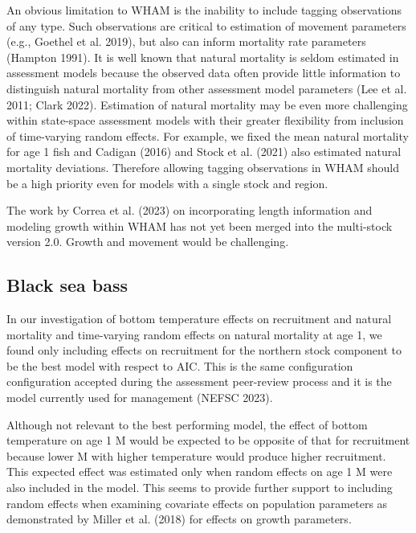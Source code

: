 \documentclass[
]{article}
\begin{document}
An obvious limitation to WHAM is the inability to include tagging
observations of any type. Such observations are critical to estimation
of movement parameters (e.g., Goethel et al. 2019), but also can inform
mortality rate parameters (Hampton 1991). It is well known that natural
mortality is seldom estimated in assessment models because the observed
data often provide little information to distinguish natural mortality
from other assessment model parameters (Lee et al. 2011; Clark 2022).
Estimation of natural mortality may be even more challenging within
state-space assessment models with their greater flexibility from
inclusion of time-varying random effects. For example, we fixed the mean
natural mortality for age 1 fish and Cadigan (2016) and Stock et al.
(2021) also estimated natural mortality deviations. Therefore allowing
tagging observations in WHAM should be a high priority even for models
with a single stock and region.

The work by Correa et al. (2023) on incorporating length information and
modeling growth within WHAM has not yet been merged into the multi-stock
version 2.0. Growth and movement would be challenging.

\hypertarget{black-sea-bass}{%
\subsection*{Black sea bass}\label{black-sea-bass}}

In our investigation of bottom temperature effects on recruitment and
natural mortality and time-varying random effects on natural mortality
at age 1, we found only including effects on recruitment for the
northern stock component to be the best model with respect to AIC. This
is the same configuration configuration accepted during the assessment
peer-review process and it is the model currently used for management
(NEFSC 2023).

Although not relevant to the best performing model, the effect of bottom
temperature on age 1 M would be expected to be opposite of that for
recruitment because lower M with higher temperature would produce higher
recruitment. This expected effect was estimated only when random effects
on age 1 M were also included in the model. This seems to provide
further support to including random effects when examining covariate
effects on population parameters as demonstrated by Miller et al. (2018)
for effects on growth parameters.
\end{document}
